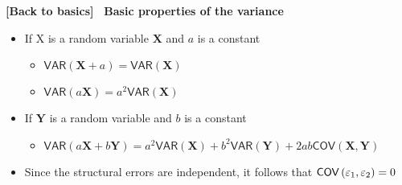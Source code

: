 \documentclass[10pt,handout]{beamer}
\begin{document}
\vspace{0.1cm}

\everymath\expandafter{\the\everymath \color{note!80}}
\everydisplay\expandafter{\the\everydisplay \color{note!80}}%

\begin{frame}
{{\footnotesize \textbf{[Back to basics]}} \textbf{\ Basic properties of the
variance }}

\begin{itemize}
\item If X is a random variable $\mathbf{X}$ and $a$ is a constant

\begin{itemize}
\item $\mathsf{VAR}\left( \mathbf{X}+a\right) =\mathsf{VAR}\left( \mathbf{X}%
\right) $

\item $\mathsf{VAR}\left( a\mathbf{X}\right) =a^{2}\mathsf{VAR}\left( 
\mathbf{X}\right) $\medskip \pause
\end{itemize}

\item If $\mathbf{Y}$ is a random variable and $b$ is a constant

\begin{itemize}
\item $\mathsf{VAR}\left( a\mathbf{X+}b\mathbf{Y}\right) =a^{2}\mathsf{VAR}%
\left( \mathbf{X}\right) +b^{2}\mathsf{VAR}\left( \mathbf{Y}\right) +2ab%
\mathsf{COV}\left( \mathbf{X},\mathbf{Y}\right) $\medskip \pause
\end{itemize}

\item Since the structural errors are independent, it follows that $\mathsf{%
COV}\left( \varepsilon _{1},\varepsilon _{2}\right) =0$
\end{itemize}
\end{frame}
\end{document}
